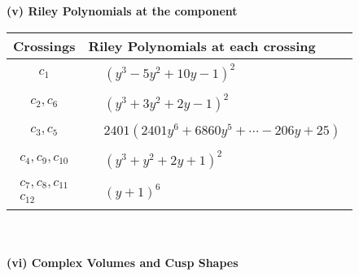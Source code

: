 \documentclass[1p]{elsarticle_modified}
\theoremstyle{definition}
\begin{document}
\flushleft \textbf{(v) Riley Polynomials at the component}\newline \\
\begin{tabular}{m{50pt}|m{274pt}}
Crossings & \hspace{64pt}Riley Polynomials at each crossing \\
\hline $$\begin{aligned}c_{1}\end{aligned}$$&$\begin{aligned}
&(y^3-5 y^2+10 y-1)^2
\end{aligned}$\\
\hline $$\begin{aligned}c_{2},c_{6}\end{aligned}$$&$\begin{aligned}
&(y^3+3 y^2+2 y-1)^2
\end{aligned}$\\
\hline $$\begin{aligned}c_{3},c_{5}\end{aligned}$$&$\begin{aligned}
&2401(2401 y^6+6860 y^5+\cdots-206 y+25)
\end{aligned}$\\
\hline $$\begin{aligned}c_{4},c_{9},c_{10}\end{aligned}$$&$\begin{aligned}
&(y^3+y^2+2 y+1)^2
\end{aligned}$\\
\hline $$\begin{aligned}c_{7},c_{8},c_{11}\\c_{12}\end{aligned}$$&$\begin{aligned}
&(y+1)^6
\end{aligned}$\\
\hline
\end{tabular}\\~\\
\newpage\flushleft \textbf{(vi) Complex Volumes and Cusp Shapes}
\end{document}

